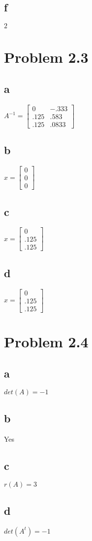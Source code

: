 \documentclass{article}
\begin{document}
\subsection*{f}
$2$


\section*{Problem 2.3}
\subsection*{a}
$ A^{-1} = 
\begin{bmatrix}
  0 & -.333 \\
  .125 & .583 \\
  .125 & .0833
\end{bmatrix}
$

\subsection*{b}
$ x = 
\begin{bmatrix}
  0 \\
  0 \\
  0
\end{bmatrix}
$

\subsection*{c}
$ x = 
\begin{bmatrix}
  0 \\
  .125 \\
  .125
\end{bmatrix}
$

\subsection*{d}
$ x = 
\begin{bmatrix}
  0 \\
  .125 \\
  .125
\end{bmatrix}
$


\section*{Problem 2.4}
\subsection*{a}
$det(A) = -1$

\subsection*{b}
Yes

\subsection*{c}
$r(A) = 3$

\subsection*{d}
$det(A^{t}) = -1$
\end{document}
